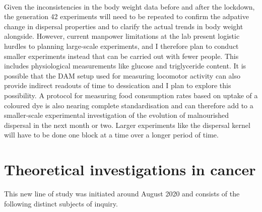 \documentclass[12pt,onecolumn,twoside]{article}
\begin{document}
	\paragraph{\empty}Given the inconsistencies in the body weight data before and after the lockdown, the generation 42 experiments will need to be repeated to confirm the adpative change in dispersal properties and to clarify the actual trends in body weight alongside. However, current manpower limitations at the lab present logistic hurdles to planning large-scale experiments, and I therefore plan to conduct smaller experiments instead that can be carried out with fewer people. This includes physiological measurements like glucose and triglyceride content. It is possible that the DAM setup used for measuring locomotor activity can also provide indirect readouts of time to dessication and I plan to explore this possibility. A protocol for measuring food consumption rates based on uptake of a coloured dye is also nearing complete standardisation and can therefore add to a smaller-scale experimental investigation of the evolution of malnourished dispersal in the next month or two. Larger experiments like the dispersal kernel will have to be done one block at a time over a longer period of time.

	\section{Theoretical investigations in cancer}
	This new line of study was initiated around August 2020 and consists of the following distinct subjects of inquiry.
\end{document}
